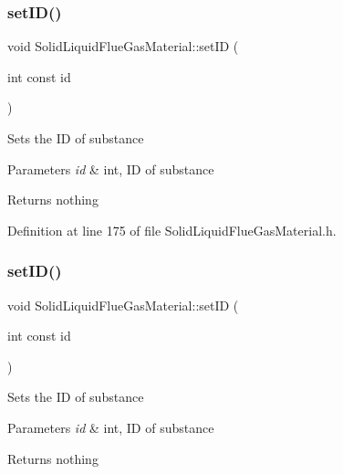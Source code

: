 \subsubsection{\texorpdfstring{set\+I\+D()}{setID()}\hspace{0.1cm}{\footnotesize\ttfamily [1/3]}}
{\footnotesize\ttfamily void Solid\+Liquid\+Flue\+Gas\+Material\+::set\+ID (\begin{DoxyParamCaption}\item[{int const}]{id }\end{DoxyParamCaption})\hspace{0.3cm}{\ttfamily [inline]}}

Sets the ID of substance 
\begin{DoxyParams}{Parameters}
{\em id} & int, ID of substance \\
\hline
\end{DoxyParams}
\begin{DoxyReturn}{Returns}
nothing 
\end{DoxyReturn}


Definition at line 175 of file Solid\+Liquid\+Flue\+Gas\+Material.\+h.

\mbox{\label{class_solid_liquid_flue_gas_material_a6046d06703bd496745121b62eab4f40f}} 
\subsubsection{\texorpdfstring{set\+I\+D()}{setID()}\hspace{0.1cm}{\footnotesize\ttfamily [2/3]}}
{\footnotesize\ttfamily void Solid\+Liquid\+Flue\+Gas\+Material\+::set\+ID (\begin{DoxyParamCaption}\item[{int const}]{id }\end{DoxyParamCaption})\hspace{0.3cm}{\ttfamily [inline]}}

Sets the ID of substance 
\begin{DoxyParams}{Parameters}
{\em id} & int, ID of substance \\
\hline
\end{DoxyParams}
\begin{DoxyReturn}{Returns}
nothing 
\end{DoxyReturn}


